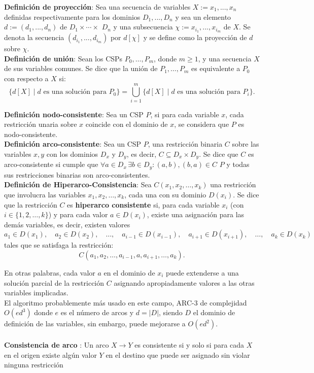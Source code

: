 \textbf{Definición de proyección}: Sea una secuencia de variables $X := x_1,..., x_n$ definidas respectivamente
para los dominios $D_1,..., D_n$ y sea un elemento $d:= (d_1,..., d_n)$ de $D_1 \times \cdots \times$
$D_n$ y una subsecuencia $\chi:= x_{i_1},..., x_{i_m}$ de $X$. Se denota la secuencia
$(d_{i_1},..., d_{i_m})$ por $d[\chi]$ y se define como la proyección de $d$ sobre $\chi$. \\


\textbf{Definición de unión}: Sean los CSPs $P_0, \ldots, P_m$, donde $m \geq 1$, y una secuencia $X$ de sus variables comunes. Se dice que la unión 
de $P_1, \ldots, P_m$ es equivalente a $P_0$ con respecto a $X$ si:
\[ \{ d[X] \mid d \text{ es una solución para } P_0 \} = \bigcup_{i=1}^m \{ d[X] \mid d \text{ es una solución para } P_i \}. \]


\textbf{Definición nodo-consistente}: Sea un CSP $P$, si para cada variable $x$, cada restricción unaria sobre $x$ coincide con el dominio de $x$, se considera
que $P$ es nodo-consistente. \\

\textbf{Definición arco-consistente}: Sea un CSP $P$, una restricción binaria $C$ sobre las variables $x, y$ con los dominios $D_x$ y $D_y$, es decir, $C \subseteq D_x \times D_y$. 
Se dice que $C$ es arco-consistente si cumple que $\forall a \in D_x \, \exists b \in D_y : (a, b),(b,a) \in C$  $P$ y todas sus restricciones binarias son 
arco-consistentes. \\


\textbf{Definición de Hiperarco-Consistencia}: Sea \( C(x_1, x_2, \dots, x_k) \) una restricción que involucra las variables \( x_1, x_2, \dots, x_k \), cada una con su dominio \( D(x_i) \). Se dice
 que la restricción \( C \) es \textbf{hiperarco consistente} si, para cada variable \( x_i \) (con \( i \in \{1,2,\dots,k\} \)) y para cada valor 
 \( a \in D(x_i) \), existe una asignación para las demás variables, es decir, existen valores
\[
a_1 \in D(x_1),\quad a_2 \in D(x_2),\quad \dots,\quad a_{i-1} \in D(x_{i-1}),\quad a_{i+1} \in D(x_{i+1}),\quad \dots,\quad a_k \in D(x_k)
\]
tales que se satisfaga la restricción:
\[
C(a_1, a_2, \dots, a_{i-1}, a, a_{i+1}, \dots, a_k).
\]

En otras palabras, cada valor \( a \) en el dominio de \( x_i \) puede extenderse a una solución parcial de la restricción \( C \) asignando apropiadamente valores a las otras variables implicadas. \\


El algoritmo probablemente más usado en este campo, ARC-3 de complejidad $O(ed^3)$ donde $e$ es el número de arcos y $d=|D|$, siendo $D$ el dominio de definición de las variables, sin embargo, puede mejorarse a $O(ed^2)$. \\ \\
\textbf{ Consistencia de arco }: Un arco $X \rightarrow Y$ es consistente si y solo si para cada $X$ en el origen existe algún valor $Y$ en el destino que puede ser asignado sin violar ninguna restricción \\

